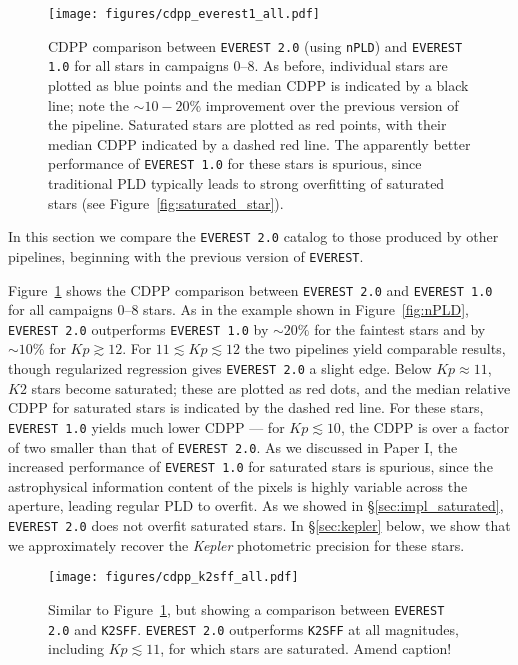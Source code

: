 \documentclass[]{emulateapj}
\newcommand{\Kp}{\ensuremath{Kp}}
\newcommand{\edited}[1]{{\color{red} #1}}
\begin{document}
\begin{figure}[hbt]
  \begin{center}
      \texttt{[image: figures/cdpp\_everest1\_all.pdf]}
       \caption{CDPP comparison between \texttt{EVEREST 2.0} (using \texttt{nPLD}) and \texttt{EVEREST 1.0} for all stars in campaigns 0--8.
       As before, individual stars are plotted as blue points and the median CDPP is indicated by a black line; note
       the ${\sim}10-20$\% improvement over the previous version of the pipeline. Saturated
       stars are plotted as red points, with their median CDPP indicated by a dashed red line. The apparently
       better performance of \texttt{EVEREST 1.0} for these stars is spurious, since traditional PLD typically
       leads to strong overfitting of saturated stars (see Figure~\ref{fig:saturated_star}).}
     \label{fig:cdpp_everest1_all}
  \end{center}
\end{figure}

In this section we compare the \texttt{EVEREST 2.0} catalog to those produced by other pipelines, beginning with the
previous version of \texttt{EVEREST}.

Figure~\ref{fig:cdpp_everest1_all} shows the CDPP comparison between \texttt{EVEREST 2.0} and
\texttt{EVEREST 1.0} for all campaigns 0--8 stars. As in the example shown in Figure~\ref{fig:nPLD},
\texttt{EVEREST 2.0} outperforms \texttt{EVEREST 1.0} by ${\sim}20\%$ for the faintest stars and by
${\sim}10\%$ for $\Kp \gtrsim 12$. For $11 \lesssim \Kp \lesssim 12$ the two pipelines yield
comparable results, though regularized regression gives \texttt{EVEREST 2.0} a slight edge. Below
$\Kp \approx 11$, $K2$ stars become saturated; these are plotted as red dots, and the median
relative CDPP for saturated stars is indicated by the dashed red line. For these stars,
\texttt{EVEREST 1.0} yields much lower CDPP --- for $\Kp \lesssim 10$, the CDPP is over a factor
of two smaller than that of \texttt{EVEREST 2.0}. As we discussed in Paper I, the increased
performance of \texttt{EVEREST 1.0} for saturated stars is spurious, since the astrophysical
information content of the pixels is highly variable across the aperture, leading regular
PLD to overfit. As we showed in \S\ref{sec:impl_saturated}, \texttt{EVEREST 2.0} does not
overfit saturated stars. In \S\ref{sec:kepler} below, we show that we approximately recover
the \emph{Kepler} photometric precision for these stars.

\begin{figure}[hbt]
  \begin{center}
      \texttt{[image: figures/cdpp\_k2sff\_all.pdf]}
       \caption{Similar to Figure~\ref{fig:cdpp_everest1_all}, but showing a comparison between \texttt{EVEREST 2.0} and \texttt{K2SFF}.
       \texttt{EVEREST 2.0} outperforms \texttt{K2SFF} at all magnitudes, including $\Kp \lesssim 11$, for which stars are saturated.
       \edited{Amend caption!}}
     \label{fig:cdpp_k2sff_all}
  \end{center}
\end{figure}
\end{document}
